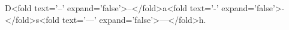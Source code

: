 D<fold text='–' expand='false'>--</fold>a<fold text='-' expand='false'>-</fold>s<fold text='—' expand='false'>---</fold>h.